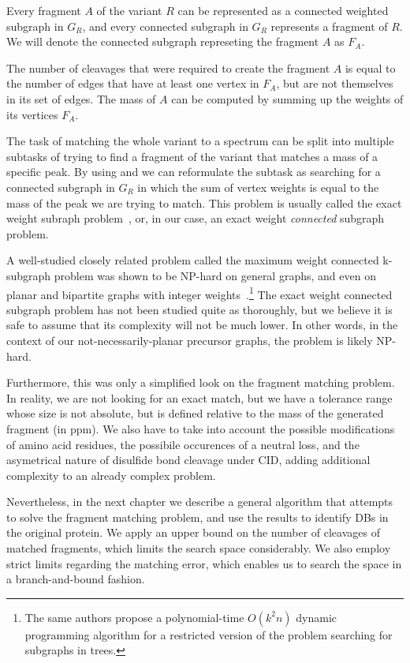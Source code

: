 \begin{lemma}\label{lemma:fragment}
  Every fragment \(A\) of the variant \(R\) can be represented as a connected weighted subgraph in \(G_R\), and every connected subgraph in \(G_R\) represents a fragment of \(R\). We will denote the connected subgraph represeting the fragment \(A\) as \(F_A\).
\end{lemma}

\begin{lemma}\label{lemma:mass}
  The number of cleavages that were required to create the fragment \(A\) is equal to the number of edges that have at least one vertex in \(F_A\), but are not themselves in its set of edges. The mass of \(A\) can be computed by summing up the weights of its vertices \(F_A\).
\end{lemma}

The task of matching the whole variant to a spectrum can be split into multiple subtasks of trying to find a fragment of the variant that matches a mass of a specific peak. By using  and  we can reformulate the subtask as searching for a connected subgraph in \(G_R\) in which the sum of vertex weights is equal to the mass of the peak we are trying to match. This problem is usually called the exact weight subraph problem~\cite{abboud2013exact}, or, in our case, an exact weight \emph{connected} subgraph problem.

A well-studied closely related problem called the maximum weight connected k-subgraph problem was shown to be NP-hard on general graphs, and even on planar and bipartite graphs with integer weights~\cite{hochbaum1994node}.\footnote{The same authors propose a polynomial-time \(O(k^2n)\) dynamic programming algorithm for a restricted version of the problem searching for subgraphs in trees.} The exact weight connected subgraph problem has not been studied quite as thoroughly, but we believe it is safe to assume that its complexity will not be much lower. In other words, in the context of our not-necessarily-planar precursor graphs, the problem is likely NP-hard.

Furthermore, this was only a simplified look on the fragment matching problem. In reality, we are not looking for an exact match, but we have a tolerance range whose size is not absolute, but is defined relative to the mass of the generated fragment (in ppm). We also have to take into account the possible modifications of amino acid residues, the possibile occurences of a neutral loss, and the asymetrical nature of disulfide bond cleavage under CID, adding additional complexity to an already complex problem.

Nevertheless, in the next chapter we describe a general algorithm that attempts to solve the fragment matching problem, and use the results to identify DBs in the original protein. We apply an upper bound on the number of cleavages of matched fragments, which limits the search space considerably. We also employ strict limits regarding the matching error, which enables us to search the space in a branch-and-bound fashion.